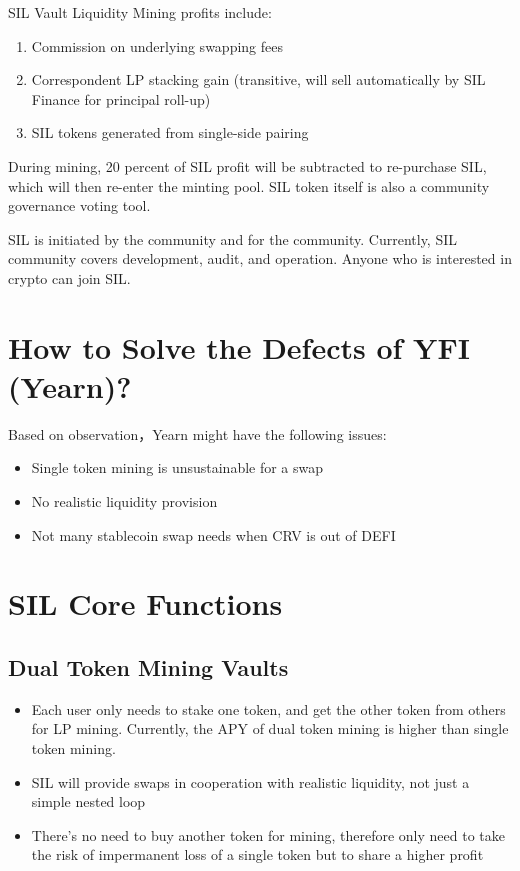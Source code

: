 \documentclass[11pt,letterpaper]{article}
\begin{document}
\begin{multicols}{2}
SIL Vault Liquidity Mining profits include:
\begin{enumerate}
    \item Commission on underlying swapping fees
    \item Correspondent LP stacking gain (transitive, will sell automatically by SIL Finance for principal roll-up)
    \item SIL tokens generated from single-side pairing
\end{enumerate}
During mining, 20 percent of SIL profit will be subtracted to re-purchase SIL, which will then re-enter the minting pool. SIL token itself is also a community governance voting tool.

SIL is initiated by the community and for the community. Currently, SIL community covers development, audit, and operation. Anyone who is interested in crypto can join SIL.

\section{How to Solve the Defects of YFI (Yearn)? }
Based on observation，Yearn might have the following issues:

\begin{itemize}
  \item Single token mining is unsustainable for a swap
  \item No realistic liquidity provision
  \item Not many stablecoin swap needs when CRV is out of DEFI
\end{itemize}

\section{SIL Core Functions}

\subsection{Dual Token Mining Vaults}
\begin{itemize}
  \item Each user only needs to stake one token, and get the other token from others for LP mining. Currently, the APY of dual token mining is higher than single token mining.
  \item SIL will provide swaps in cooperation with realistic liquidity, not just a simple nested loop
  \item There's no need to buy another token for mining, therefore only need to take the risk of impermanent loss of a single token but to share a higher profit
\end{itemize}


\end{multicols}
\end{document}
